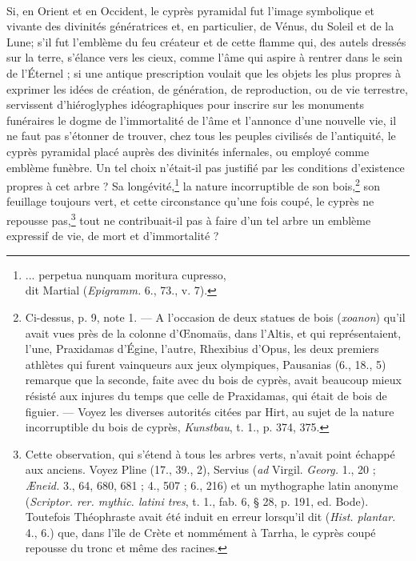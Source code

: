 \documentclass{article}
\begin{document}
\paragraph{}
Si, en Orient et en Occident, le cyprès pyramidal fut l'image symbolique et vivante des divinités génératrices et, en particulier, de Vénus, du Soleil et de la Lune; s'il fut l'emblème du feu créateur et de cette flamme qui, des autels dressés sur la terre, s'élance vers les cieux, comme l'âme qui aspire à rentrer dans le sein de l'Éternel ; si une antique prescription voulait que les objets les plus propres à exprimer les idées de création, de génération, de reproduction, ou de vie terrestre, servissent d'hiéroglyphes idéographiques pour inscrire sur les monuments funéraires le dogme de l'immortalité de l'âme et l'annonce d'une nouvelle vie, il ne faut pas s'étonner de trouver, chez tous les peuples civilisés de l'antiquité, le cyprès pyramidal placé auprès des divinités infernales, ou employé comme emblème funèbre. Un tel choix n'était-il pas justifié par les conditions d'existence propres à cet arbre ? Sa longévité,\footnote{... perpetua nunquam moritura cupresso,\\\hspace*{5mm}dit Martial (\emph{Epigramm.} 6., 73., v. 7).} la nature incorruptible de son bois,\footnote{Ci-dessus, p. 9, note 1. --- A l'occasion de deux statues de bois (\emph{xoanon}) qu'il avait vues près de la colonne d'Œnomaüs, dans l'Altis, et qui représentaient, l'une, Praxidamas d'Égine, l'autre, Rhexibius d'Opus, les deux premiers athlètes qui furent vainqueurs aux jeux olympiques, Pausanias (6., 18., 5) remarque que la seconde, faite avec du bois de cyprès, avait beaucoup mieux résisté aux injures du temps que celle de Praxidamas, qui était de bois de figuier. --- Voyez les diverses autorités citées par Hirt, au sujet de la nature incorruptible du bois de cyprès, \emph{Kunstbau}, t. 1., p. 374, 375.} son feuillage toujours vert, et cette circonstance qu'une fois coupé, le cyprès ne repousse pas,\footnote{Cette observation, qui s'étend à tous les arbres verts, n'avait point échappé aux anciens. Voyez Pline (17., 39., 2), Servius (\emph{ad} Virgil. \emph{Georg.} 1., 20 ; \emph{Æneid.} 3., 64, 680, 681 ; 4., 507 ; 6., 216) et un mythographe latin anonyme (\emph{Scriptor. rer. mythic. latini tres}, t. 1., fab. 6, § 28, p. 191, ed. Bode). Toutefois Théophraste avait été induit en erreur lorsqu'il dit (\emph{Hist. plantar.} 4., 6.) que, dans l'île de Crète et nommément à Tarrha, le cyprès coupé repousse du tronc et même des racines.} tout ne contribuait-il pas à faire d'un tel arbre un emblème expressif de vie, de mort et d'immortalité ?
\end{document}
